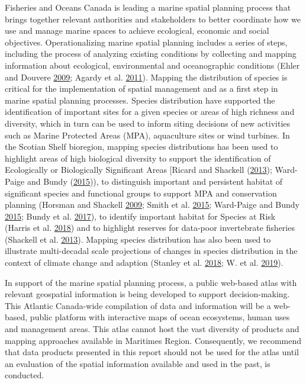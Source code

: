 \documentclass[12pt]{article}\usepackage[]{graphicx}\usepackage[]{color}
\begin{document}
Fisheries and Oceans Canada is leading a marine spatial planning process that brings together relevant authorities and stakeholders to better coordinate how we use and manage marine spaces to achieve ecological, economic and social objectives. Operationalizing marine spatial planning includes a series of steps, including the process of analyzing existing conditions by collecting and mapping information about ecological, environmental and oceanographic conditions (Ehler and Douvere \protect\hyperlink{ref-Ehler:2009}{2009}; Agardy et al. \protect\hyperlink{ref-Agardy:2011}{2011}). Mapping the distribution of species is critical for the implementation of spatial management and as a first step in marine spatial planning processes. Species distribution have supported the identification of important sites for a given species or areas of high richness and diversity, which in turn can be used to inform siting decisions of new activities such as Marine Protected Areas (MPA), aquaculture sites or wind turbines. In the Scotian Shelf bioregion, mapping species distributions has been used to highlight areas of high biological diversity to support the identification of Ecologically or Biologically Significant Areas {[}Ricard and Shackell (\protect\hyperlink{ref-Ricard:MARatlas:2013}{2013}); Ward-Paige and Bundy (\protect\hyperlink{ref-WardPaige2016}{2015})), to distinguish important and persistent habitat of significant species and functional groups to support MPA and conservation planning (Horsman and Shackell \protect\hyperlink{ref-Horsman:atlas:2009}{2009}; Smith et al. \protect\hyperlink{ref-Smith2015}{2015}; Ward-Paige and Bundy \protect\hyperlink{ref-WardPaige2016}{2015}; Bundy et al. \protect\hyperlink{ref-Bundyetal2017}{2017}), to identify important habitat for Species at Risk (Harris et al. \protect\hyperlink{ref-Harris:2018}{2018}) and to highlight reserves for data-poor invertebrate fisheries (Shackell et al. \protect\hyperlink{ref-Shackell2013}{2013}). Mapping species distribution has also been used to illustrate multi-decadal scale projections of changes in species distribution in the context of climate change and adaption (Stanley et al. \protect\hyperlink{ref-Stanley:2018}{2018}; W. et al. \protect\hyperlink{ref-Greenan:2019}{2019}).

In support of the marine spatial planning process, a public web-based atlas with relevant geospatial information is being developed to support decision-making. This Atlantic Canada-wide compilation of data and information will be a web-based, public platform with interactive maps of ocean ecosystems, human uses and management areas. This atlas cannot host the vast diversity of products and mapping approaches available in Maritimes Region. Consequently, we recommend that data products presented in this report should not be used for the atlas until an evaluation of the spatial information available and used in the past, is conducted.
\end{document}
